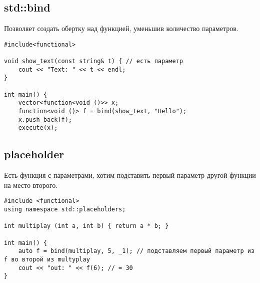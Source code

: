 \subsection{std::bind}
Позволяет создать обертку над функцией, уменьшив количество параметров. 
\begin{verbatim}
#include<functional>

void show_text(const string& t) { // есть параметр
    cout << "Text: " << t << endl;
}

int main() {
	vector<function<void ()>> x;
	function<void ()> f = bind(show_text, "Hello");
	x.push_back(f);
	execute(x);
\end{verbatim}

\subsection{placeholder}
Есть функция с параметрами, хотим подставить первый параметр другой функции на место второго.  
\begin{verbatim}
#include <functional>
using namespace std::placeholders;

int multiplay (int a, int b) { return a * b; }

int main() {
    auto f = bind(multiplay, 5, _1); // подставляем первый параметр из f во второй из multyplay
	cout << "out: " << f(6); // = 30
}
\end{verbatim}

